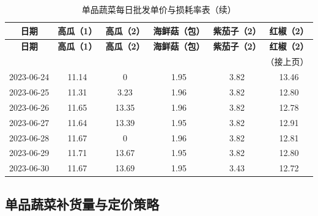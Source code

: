 \documentclass[a4paper,12pt]{article}
\begin{document}
	\begin{longtable}{c|c|c|c|c|c}
		\caption{单品蔬菜每日批发单价与损耗率表（续）} \\
		\hline
		\textbf{日期} & \textbf{高瓜（1）} & \textbf{高瓜（2）} & \textbf{海鲜菇（包）} & \textbf{紫茄子（2）} & \textbf{红椒（2）} \\
		\hline
		\endfirsthead
		\hline
		\textbf{日期} & \textbf{高瓜（1）} & \textbf{高瓜（2）} & \textbf{海鲜菇（包）} & \textbf{紫茄子（2）} & \textbf{红椒（2）} \\
		\hline
		\endhead
		\hline
		\multicolumn{6}{r}{（接上页）} \\
		\endfoot
		\hline
		\endlastfoot
		
		2023-06-24 & 11.14 & 0 & 1.95 & 3.82 & 13.46 \\
		2023-06-25 & 11.31 & 3.23 & 1.96 & 3.82 & 12.80 \\
		2023-06-26 & 11.65 & 13.35 & 1.96 & 3.82 & 12.78 \\
		2023-06-27 & 11.64 & 13.39 & 1.95 & 3.82 & 12.91 \\
		2023-06-28 & 11.67 & 0 & 1.96 & 3.82 & 12.81 \\
		2023-06-29 & 11.71 & 13.67 & 1.95 & 3.82 & 12.80 \\
		2023-06-30 & 11.67 & 13.69 & 1.95 & 3.43 & 12.72 \\
		
	\end{longtable}
	
	\subsection{单品蔬菜补货量与定价策略}
	
\end{document}
